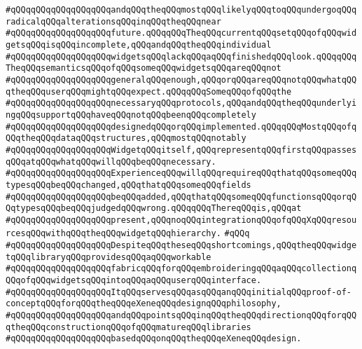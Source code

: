 \verb|#qQQqqQQqqQQqqQQqqQQqandqQQqtheqQQqmostqQQqlikelyqQQqtoqQQqundergoqQQqradicalqQQqalterationsqQQqinqQQqtheqQQqnear|\newline
\verb|#qQQqqQQqqQQqqQQqqQQqfuture.qQQqqQQqTheqQQqcurrentqQQqsetqQQqofqQQqwidgetsqQQqisqQQqincomplete,qQQqandqQQqtheqQQqindividual|\newline
\verb|#qQQqqQQqqQQqqQQqqQQqwidgetsqQQqlackqQQqaqQQqfinishedqQQqlook.qQQqqQQqTheqQQqsemanticsqQQqofqQQqsomeqQQqwidgetsqQQqareqQQqnot|\newline
\verb|#qQQqqQQqqQQqqQQqqQQqgeneralqQQqenough,qQQqorqQQqareqQQqnotqQQqwhatqQQqtheqQQquserqQQqmightqQQqexpect.qQQqqQQqSomeqQQqofqQQqthe|\newline
\verb|#qQQqqQQqqQQqqQQqqQQqnecessaryqQQqprotocols,qQQqandqQQqtheqQQqunderlyingqQQqsupportqQQqhaveqQQqnotqQQqbeenqQQqcompletely|\newline
\verb|#qQQqqQQqqQQqqQQqqQQqdesignedqQQqorqQQqimplemented.qQQqqQQqMostqQQqofqQQqtheqQQqdataqQQqstructures,qQQqmostqQQqnotably|\newline
\verb|#qQQqqQQqqQQqqQQqqQQqWidgetqQQqitself,qQQqrepresentqQQqfirstqQQqpassesqQQqatqQQqwhatqQQqwillqQQqbeqQQqnecessary.|\newline
\verb|#qQQqqQQqqQQqqQQqqQQqExperienceqQQqwillqQQqrequireqQQqthatqQQqsomeqQQqtypesqQQqbeqQQqchanged,qQQqthatqQQqsomeqQQqfields|\newline
\verb|#qQQqqQQqqQQqqQQqqQQqbeqQQqadded,qQQqthatqQQqsomeqQQqfunctionsqQQqorqQQqtypesqQQqbeqQQqjudgedqQQqwrong.qQQqqQQqThereqQQqis,qQQqat|\newline
\verb|#qQQqqQQqqQQqqQQqqQQqpresent,qQQqnoqQQqintegrationqQQqofqQQqXqQQqresourcesqQQqwithqQQqtheqQQqwidgetqQQqhierarchy.|\newline
\verb|#qQQq|\newline
\verb|#qQQqqQQqqQQqqQQqqQQqDespiteqQQqtheseqQQqshortcomings,qQQqtheqQQqwidgetqQQqlibraryqQQqprovidesqQQqaqQQqworkable|\newline
\verb|#qQQqqQQqqQQqqQQqqQQqfabricqQQqforqQQqembroideringqQQqaqQQqcollectionqQQqofqQQqwidgetsqQQqintoqQQqaqQQquserqQQqinterface.|\newline
\verb|#qQQqqQQqqQQqqQQqqQQqItqQQqservesqQQqasqQQqanqQQqinitialqQQqproof-of-conceptqQQqforqQQqtheqQQqeXeneqQQqdesignqQQqphilosophy,|\newline
\verb|#qQQqqQQqqQQqqQQqqQQqandqQQqpointsqQQqinqQQqtheqQQqdirectionqQQqforqQQqtheqQQqconstructionqQQqofqQQqmatureqQQqlibraries|\newline
\verb|#qQQqqQQqqQQqqQQqqQQqbasedqQQqonqQQqtheqQQqeXeneqQQqdesign.|\newline
